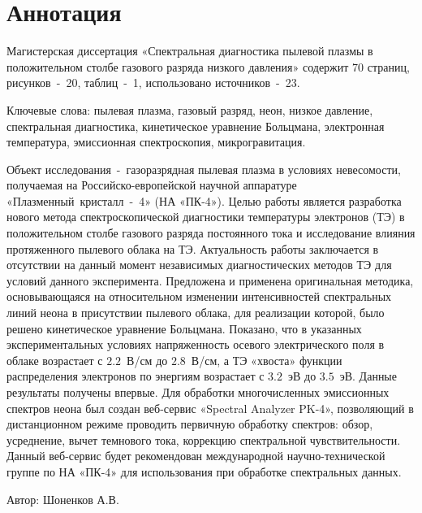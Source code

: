 \chapter*{Аннотация}

Магистерская диссертация «Спектральная диагностика пылевой плазмы в положительном столбе газового разряда низкого давления»
содержит 70 страниц, рисунков~-~20, таблиц~-~1, использовано источников~-~23.

Ключевые слова: пылевая плазма, газовый разряд, неон, низкое давление, спектральная диагностика,
кинетическое уравнение Больцмана, электронная температура, эмиссионная спектроскопия, микрогравитация.

Объект исследования~-~газоразрядная пылевая плазма в условиях невесомости,
получаемая на Российско-европейской научной аппаратуре «Плазменный~кристалл~-~4» (НА «ПК-4»).
Целью работы является разработка нового метода спектроскопической диагностики температуры электронов (ТЭ) в
положительном столбе газового разряда постоянного тока и исследование влияния
протяженного пылевого облака на ТЭ. Актуальность работы
заключается в отсутствии на данный момент независимых диагностических методов
ТЭ для условий данного эксперимента.
Предложена и применена оригинальная методика, основывающаяся на
относительном изменении интенсивностей спектральных линий неона в
присутствии пылевого облака, для реализации которой, было решено
кинетическое уравнение Больцмана. Показано, что в указанных
экспериментальных условиях напряженность осевого электрического поля в облаке
возрастает с $2.2$~В/см до $2.8$~В/см, а ТЭ «хвоста» функции распределения
электронов по энергиям возрастает с $3.2$~эВ до $3.5$~эВ. Данные результаты
получены впервые. Для обработки многочисленных эмиссионных спектров неона
был создан веб-сервис «Spectral Analyzer PK-4», позволяющий в дистанционном
режиме проводить первичную обработку спектров: обзор, усреднение, вычет
темнового тока, коррекцию спектральной чувствительности. Данный
веб-сервис будет рекомендован международной научно-технической группе по НА
«ПК-4» для использования при обработке спектральных данных.

\vfill
\vfill
\begin{minipage}{.49\textwidth}\end{minipage}
\hfill
\begin{minipage}{.49\textwidth}
    Автор: \uline{\hfill} Шоненков А.В.
\end{minipage}
\vfill
